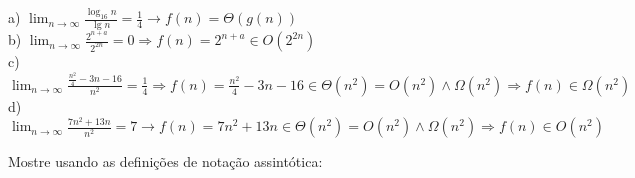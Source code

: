 \documentclass[a4paper]{exam}
\begin{document}
\begin{questions}
  \begin{solution}
    a) $\displaystyle\lim_{n\to\infty} \frac{\log_{16} n}{\lg n} = \frac{1}{4} \to f(n) = \Theta(g(n))$ \\
    b) $\displaystyle\lim_{n\to\infty} \frac{2^{n+a}}{2^{2n}} = 0 \Rightarrow f(n) = 2^{n+a} \in O(2^{2n})$ \\
    c) $\displaystyle\lim_{n\to\infty} \frac{\frac{n^2}{4} -3n - 16}{n^2} = \frac{1}{4} \Rightarrow f(n) = \frac{n^2}{4} -3n - 16 
        \in \Theta(n^2) =  O(n^2) \land  \Omega(n^2)  \Rightarrow f(n) \in \Omega(n^2)$\\
    d) $\displaystyle\lim_{n\to\infty} \frac{7n^2 +13n}{n^2} = 7 \to f(n) = 7n^2 +13n
        \in \Theta(n^2) =  O(n^2) \land  \Omega(n^2) \Rightarrow f(n) \in O(n^2)$
  \end{solution}
  \question Mostre usando as definições de notação assintótica:
  \begin{parts}

\end{parts}
\end{questions}
\end{document}
